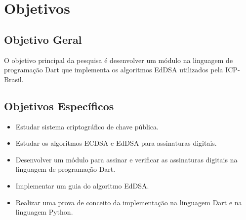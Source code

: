 
\section{Objetivos}

\subsection{Objetivo Geral}

O objetivo principal da pesquisa é desenvolver um módulo na linguagem de programação Dart que implementa os algoritmos EdDSA utilizados pela ICP-Brasil.

\subsection{Objetivos Específicos}

\begin{itemize}
    \item Estudar sistema criptográfico de chave pública.
    \item Estudar os algoritmos ECDSA e EdDSA para assinaturas digitais.
    \item Desenvolver um módulo para assinar e verificar as assinaturas digitais na linguagem de programação Dart.
    \item Implementar um guia do algoritmo EdDSA.
    \item Realizar uma prova de conceito da implementação na linguagem Dart e na linguagem Python. 
\end{itemize}
    